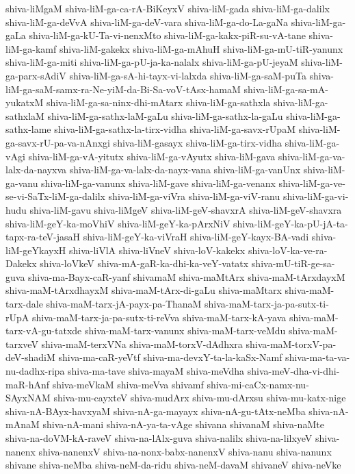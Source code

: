 {shiva-liMgaM
shiva-liM-ga-ca-rA-BiKeyxV
shiva-liM-gada
shiva-liM-ga-dalilx
shiva-liM-ga-deVvA
shiva-liM-ga-deV-vara
shiva-liM-ga-do-La-gaNa
shiva-liM-ga-gaLa
shiva-liM-ga-kU-Ta-vi-nenxMto
shiva-liM-ga-kakx-piR-su-vA-tane
shiva-liM-ga-kamf
shiva-liM-gakekx
shiva-liM-ga-mAhuH
shiva-liM-ga-mU-tiR-yanunx
shiva-liM-ga-miti
shiva-liM-ga-pU-ja-ka-nalalx
shiva-liM-ga-pU-jeyaM
shiva-liM-ga-parx-sAdiV
shiva-liM-ga-sA-hi-tayx-vi-lalxda
shiva-liM-ga-saM-puTa
shiva-liM-ga-saM-samx-ra-Ne-yiM-da-Bi-Sa-voV-tAsx-hamaM
shiva-liM-ga-sa-mA-yukatxM
shiva-liM-ga-sa-ninx-dhi-mAtarx
shiva-liM-ga-sathxla
shiva-liM-ga-sathxlaM
shiva-liM-ga-sathx-laM-gaLu
shiva-liM-ga-sathx-la-gaLu
shiva-liM-ga-sathx-lame
shiva-liM-ga-sathx-la-tirx-vidha
shiva-liM-ga-savx-rUpaM
shiva-liM-ga-savx-rU-pa-va-nAnxgi
shiva-liM-gasayx
shiva-liM-ga-tirx-vidha
shiva-liM-ga-vAgi
shiva-liM-ga-vA-yitutx
shiva-liM-ga-vAyutx
shiva-liM-gava
shiva-liM-ga-va-lalx-da-nayxva
shiva-liM-ga-va-lalx-da-nayx-vana
shiva-liM-ga-vanUnx
shiva-liM-ga-vanu
shiva-liM-ga-vanunx
shiva-liM-gave
shiva-liM-ga-venanx
shiva-liM-ga-ve-se-vi-SaTx-liM-ga-dalilx
shiva-liM-ga-viVra
shiva-liM-ga-viV-ranu
shiva-liM-ga-vi-hudu
shiva-liM-gavu
shiva-liMgeV
shiva-liM-geV-shavxrA
shiva-liM-geV-shavxra
shiva-liM-geY-ka-moVhiV
shiva-liM-geY-ka-pArxNiV
shiva-liM-geY-ka-pU-jA-ta-tapx-ra-teV-jasaH
shiva-liM-geY-ka-viVraH
shiva-liM-geY-kayx-BA-vadi
shiva-liM-geYkayxH
shiva-liVlA
shiva-liVneV
shiva-loV-kakekx
shiva-loV-ka-ve-ra-Dakekx
shiva-loVkeV
shiva-mA-gaR-ka-dhi-ka-veY-vatatx
shiva-mU-tiR-ge-sa-guva
shiva-ma-Bayx-caR-yanf
shivamaM
shiva-maMtArx
shiva-maM-tArxdayxM
shiva-maM-tArxdhayxM
shiva-maM-tArx-di-gaLu
shiva-maMtarx
shiva-maM-tarx-dale
shiva-maM-tarx-jA-payx-pa-ThanaM
shiva-maM-tarx-ja-pa-sutx-ti-rUpA
shiva-maM-tarx-ja-pa-sutx-ti-reVva
shiva-maM-tarx-kA-yava
shiva-maM-tarx-vA-gu-tatxde
shiva-maM-tarx-vanunx
shiva-maM-tarx-veMdu
shiva-maM-tarxveV
shiva-maM-terxVNa
shiva-maM-torxV-dAdhxra
shiva-maM-torxV-pa-deV-shadiM
shiva-ma-caR-yeVtf
shiva-ma-devxY-ta-la-kaSx-Namf
shiva-ma-ta-va-nu-dadhx-ripa
shiva-ma-tave
shiva-mayaM
shiva-meVdha
shiva-meV-dha-vi-dhi-maR-hAnf
shiva-meVkaM
shiva-meVva
shivamf
shiva-mi-caCx-namx-nu-SAyxNAM
shiva-mu-cayxteV
shiva-mudArx
shiva-mu-dArxsu
shiva-mu-katx-nige
shiva-nA-BAyx-havxyaM
shiva-nA-ga-mayayx
shiva-nA-gu-tAtx-neMba
shiva-nA-mAnaM
shiva-nA-mani
shiva-nA-ya-ta-vAge
shivana
shivanaM
shiva-naMte
shiva-na-doVM-kA-raveV
shiva-na-lAlx-guva
shiva-nalilx
shiva-na-lilxyeV
shiva-nanenx
shiva-nanenxV
shiva-na-nonx-babx-nanenxV
shiva-nanu
shiva-nanunx
shivane
shiva-neMba
shiva-neM-da-ridu
shiva-neM-davaM
shivaneV
shiva-neVke
}
